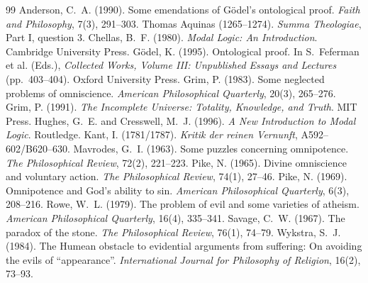 \documentclass{situationist-preprint}
\begin{document}
\begin{thebibliography}{99}\small
{} Anderson, C.~A. (1990). Some emendations of Gödel's ontological proof. \emph{Faith and Philosophy}, 7(3), 291--303.
 Thomas Aquinas (1265--1274). \emph{Summa Theologiae}, Part I, question 3.
 Chellas, B.~F. (1980). \emph{Modal Logic: An Introduction}. Cambridge University Press.
 Gödel, K. (1995). Ontological proof. In S.~Feferman et al. (Eds.), \emph{Collected Works, Volume III: Unpublished Essays and Lectures} (pp.~403--404). Oxford University Press.
 Grim, P. (1983). Some neglected problems of omniscience. \emph{American Philosophical Quarterly}, 20(3), 265--276.
 Grim, P. (1991). \emph{The Incomplete Universe: Totality, Knowledge, and Truth}. MIT Press.
 Hughes, G.~E. and Cresswell, M.~J. (1996). \emph{A New Introduction to Modal Logic}. Routledge.
 Kant, I. (1781/1787). \emph{Kritik der reinen Vernunft}, A592--602/B620--630.
 Mavrodes, G.~I. (1963). Some puzzles concerning omnipotence. \emph{The Philosophical Review}, 72(2), 221--223.
 Pike, N. (1965). Divine omniscience and voluntary action. \emph{The Philosophical Review}, 74(1), 27--46.
 Pike, N. (1969). Omnipotence and God's ability to sin. \emph{American Philosophical Quarterly}, 6(3), 208--216.
 Rowe, W.~L. (1979). The problem of evil and some varieties of atheism. \emph{American Philosophical Quarterly}, 16(4), 335--341.
 Savage, C.~W. (1967). The paradox of the stone. \emph{The Philosophical Review}, 76(1), 74--79.
 Wykstra, S.~J. (1984). The Humean obstacle to evidential arguments from suffering: On avoiding the evils of \enquote{appearance}. \emph{International Journal for Philosophy of Religion}, 16(2), 73--93.
\end{thebibliography}
\end{document}
